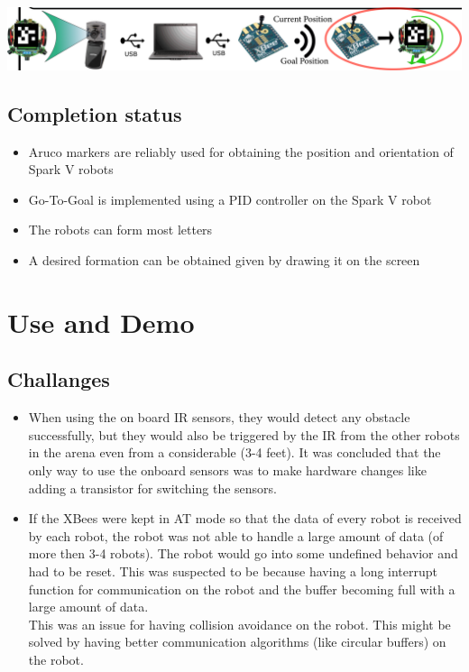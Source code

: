\documentclass[a4paper,12pt,oneside]{book}
\begin{document}
		\includegraphics[scale = .2]{Images/flow.png}
		
	\section{Completion status}
	\begin{itemize}
		\item Aruco markers are reliably used for obtaining the position and orientation of Spark V robots
		\item Go-To-Goal is implemented using a PID controller on the Spark V robot
		\item The robots can form most letters 
		\item A desired formation can be obtained given by drawing it on the screen
	\end{itemize}
		
	
	
	
	
	
	\chapter[Project Tag]{Use and Demo}
	
	\section{Challanges}
	\begin{itemize}
		\item When using the on board IR sensors, they would detect any obstacle successfully, but they would also be triggered by the IR from the other robots in the arena even from a considerable (3-4 feet). It was concluded that the only way to use the onboard sensors was to make hardware changes like adding a transistor for switching the sensors.
		\item If the XBees were kept in AT mode so that the data of every robot is received by each robot, the robot was not able to handle a large amount of data (of more then 3-4 robots). The robot would go into some undefined behavior and had to be reset. This was suspected to be because having a long interrupt function for communication on the robot and the buffer becoming full with a large amount of data.\\
		This was an issue for having collision avoidance on the robot. This might be solved by having better communication algorithms (like circular buffers) on the robot.
	\end{itemize}
		
\end{document}
